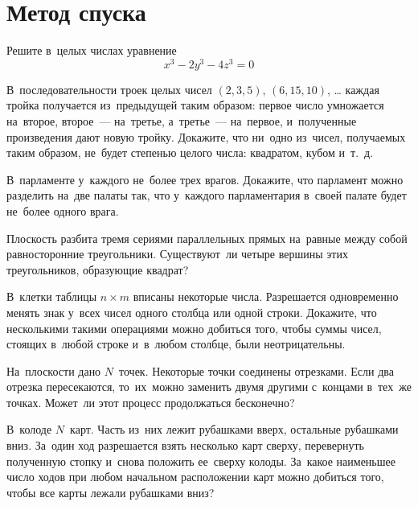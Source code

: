 
\section*{Метод спуска}


\begin{problems}

\item
Решите в~целых числах уравнение
\begin{equation*}
    x^3 - 2 y^3 - 4 z^3 = 0
\end{equation*}

\item
В~последовательности троек целых чисел $(2, 3, 5)$, $(6, 15, 10)$, \ldots
каждая тройка получается из~предыдущей таким образом: первое число умножается
на~второе, второе~— на~третье, а~третье~— на~первое, и~полученные
произведения дают новую тройку.
Докажите, что ни~одно из~чисел, получаемых таким образом, не~будет степенью
целого числа: квадратом, кубом и~т.~д.

\item
В~парламенте у~каждого не~более трех врагов.
Докажите, что парламент можно разделить на~две палаты так, что у~каждого
парламентария в~своей палате будет не~более одного врага.

\item
Плоскость разбита тремя сериями параллельных прямых на~равные между собой
равносторонние треугольники.
Существуют~ли четыре вершины этих треугольников, образующие квадрат?

\item
В~клетки таблицы $n \times m$ вписаны некоторые числа.
Разрешается одновременно менять знак у~всех чисел одного столбца или одной
строки.
Докажите, что несколькими такими операциями можно добиться того, чтобы суммы
чисел, стоящих в~любой строке и~в~любом столбце, были неотрицательны.

\item
На~плоскости дано $N$~точек.
Некоторые точки соединены отрезками.
Если два отрезка пересекаются, то~их~можно заменить двумя другими с~концами
в~тех~же точках.
Может~ли этот процесс продолжаться бесконечно?

\item
В~колоде $N$~карт.
Часть из~них лежит рубашками вверх, остальные рубашками вниз.
За~один ход разрешается взять несколько карт сверху, перевернуть полученную
стопку и~снова положить ее~сверху колоды.
За~какое наименьшее число ходов при любом начальном расположении карт можно
добиться того, чтобы все карты лежали рубашками вниз?


\end{problems}
